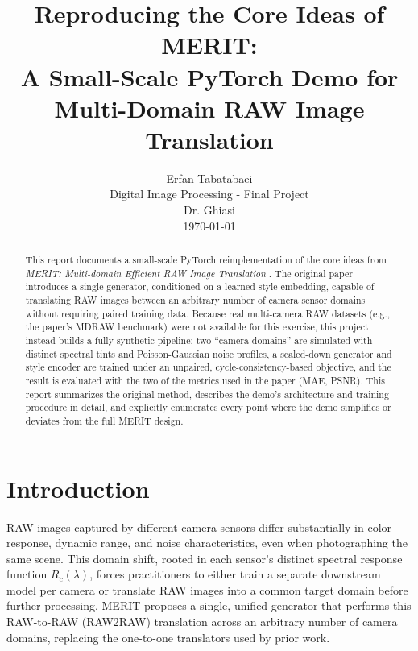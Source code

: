 \documentclass[11pt]{article}
\title{Reproducing the Core Ideas of MERIT: \\
       A Small-Scale PyTorch Demo for Multi-Domain RAW Image Translation}
\author{
    Erfan Tabatabaei \\
    \small Digital Image Processing - Final Project \\
    \small Dr. Ghiasi \\
    \small \today
}
\date{}
\begin{document}
\maketitle
\thispagestyle{empty}
\newpage

\begin{abstract}
This report documents a small-scale PyTorch reimplementation of the core
ideas from \emph{MERIT: Multi-domain Efficient RAW Image Translation}
\cite{merit2026}. The original paper introduces a single generator,
conditioned on a learned style embedding, capable of translating RAW
images between an arbitrary number of camera sensor domains without
requiring paired training data. Because real multi-camera RAW datasets
(e.g., the paper's MDRAW benchmark) were not available for this exercise,
this project instead builds a fully synthetic pipeline: two ``camera
domains'' are simulated with distinct spectral tints and Poisson-Gaussian
noise profiles, a scaled-down generator and style encoder are trained
under an unpaired, cycle-consistency-based objective, and the result is
evaluated with the two of the metrics used in the paper (MAE, PSNR).
This report summarizes the original method,
describes the demo's architecture and training procedure in detail,
and explicitly enumerates every point where the demo simplifies or
deviates from the full MERIT design.
\end{abstract}
\newpage

\tableofcontents
\newpage

\section{Introduction}

RAW images captured by different camera sensors differ substantially in
color response, dynamic range, and noise characteristics, even when
photographing the same scene. This domain shift, rooted in each sensor's
distinct spectral response function $R_c(\lambda)$, forces practitioners
to either train a separate downstream model per camera or translate RAW
images into a common target domain before further processing. MERIT
\cite{merit2026} proposes a single, unified generator that performs this
RAW-to-RAW (RAW2RAW) translation across an arbitrary number of camera
domains, replacing the one-to-one translators used by prior work.
\end{document}
